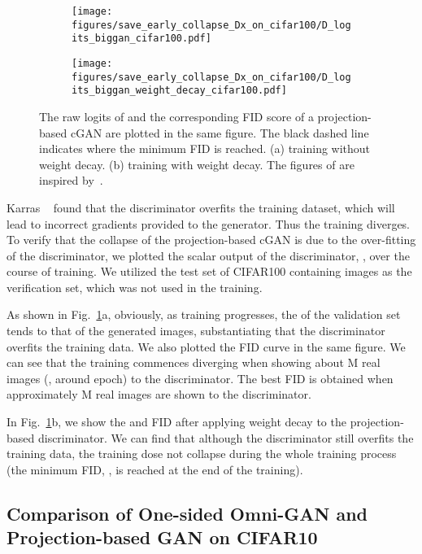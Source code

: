 \documentclass[paper_2425.tex]{subfiles}
\begin{document}
\begin{figure}[!t]
  \begin{subfigure}{0.49\linewidth}
    \centering
\texttt{[image: figures/save\_early\_collapse\_Dx\_on\_cifar100/D\_logits\_biggan\_cifar100.pdf]}
\caption{}
  \end{subfigure}
\begin{subfigure}{.49\linewidth}
    \centering
    \texttt{[image: figures/save\_early\_collapse\_Dx\_on\_cifar100/D\_logits\_biggan\_weight\_decay\_cifar100.pdf]}
    \caption{}
  \end{subfigure}
  \vspace{-0.3cm}
  \caption{The raw logits of  and the corresponding FID score of a projection-based cGAN are plotted in the same figure. The black dashed line indicates where the minimum FID is reached. (a) training without weight decay. (b) training with weight decay.  The figures of  are inspired by~\cite{karras2020Training}.}
  \label{apx:fig:early_collapse}
\end{figure}


Karras \etal~\cite{karras2020Training} found that the discriminator overfits the training dataset, which will lead to incorrect gradients provided to the generator. Thus the training diverges. To verify that the collapse of the projection-based cGAN is due to the over-fitting of the discriminator, we plotted the scalar output of the discriminator, , over the course of training. We utilized the test set of CIFAR100 containing  images as the verification set, which was not used in the training.

As shown in Fig.~\ref{apx:fig:early_collapse}a, obviously, as training progresses, the  of the validation set tends to that of the generated images, substantiating that the discriminator overfits the training data. We also plotted the FID curve in the same figure. We can see that the training commences diverging when showing about M real images (\ie, around  epoch) to the discriminator. The best FID is obtained when approximately M real images are shown to the discriminator.

In Fig.~\ref{apx:fig:early_collapse}b, we show the  and FID after applying weight decay to the projection-based discriminator. We can find that although the discriminator still overfits the training data, the training dose not collapse during the whole training process (the minimum FID, , is reached at the end of the training).




\subsection{Comparison of One-sided Omni-GAN and Projection-based GAN on CIFAR10}
\label{apx:sec:one_side}
\end{document}
